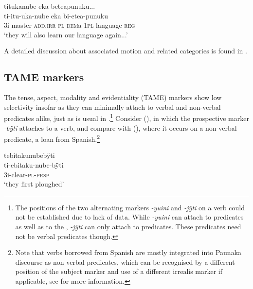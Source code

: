 \ea\label{ex:FirstAM-3}
\begingl
\glpreamble titukanube eka beteapunuku...\\
\gla ti-itu-uka-nube eka bi-etea-punuku\\
\glb 3i-master-\textsc{add.irr}-\textsc{pl} \textsc{dem}a 1\textsc{pl}-language-\textsc{reg}\\
\glft ‘they will also learn our language again...’
\endgl
\trailingcitation{[mxx-x110917.18]}
\xe
{}

A detailed discussion about associated motion and related categories is found in .


\subsection{TAME markers}\label{sec:AffClTAME}

The tense, aspect, modality and evidentiality (TAME) markers show low selectivity insofar as they can minimally attach to verbal and non-verbal predicates alike, just as is usual in  \citep[cf.][13]{Overall2018}.\footnote{The positions of the two alternating  markers \textit{-yuini} and \textit{-jÿti} on a verb could not be established due to lack of data. While \textit{-yuini} can attach to predicates as well as to the , \textit{-jÿti} can only attach to predicates. These predicates need not be verbal predicates though.} Consider (), in which the  prospective marker \textit{-bÿti} attaches to a verb, and compare with (), where it occurs on a non-verbal predicate, a loan from Spanish.\footnote{Note that verbs borrowed from Spanish are mostly integrated into Paunaka discourse as non-verbal predicates, which can be recognised by a different position of the subject marker and use of a different irrealis marker if applicable, see  for more information.}

\ea\label{ex:new23-prsp-1}
\begingl
\glpreamble tebitakunubebÿti\\
\gla ti-ebitaku-nube-bÿti\\
\glb 3i-clear-\textsc{pl}-\textsc{prsp}\\
\glft ‘they first ploughed’
\endgl
\trailingcitation{[jxx-p120515l-2.113]}
\xe

